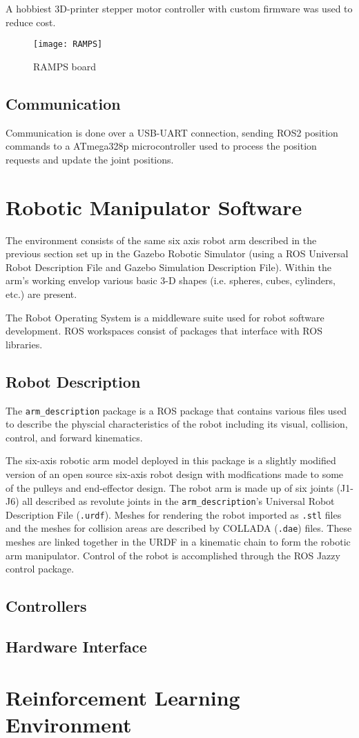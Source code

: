 A hobbiest 3D-printer stepper motor controller with custom firmware was used to reduce cost.
\begin{figure}[htb]
  \centering
  \texttt{[image: RAMPS]}
  \caption{RAMPS board}
  \label{fig:ramps}
\end{figure}

\subsection{Communication} \label{ss:communication}
Communication is done over a USB-UART connection, sending ROS2 position commands to a ATmega328p microcontroller used to process the position requests and update the joint positions.


\section{Robotic Manipulator Software} \label{se:virtual_overview}
The environment consists of the same six axis robot arm described in the previous section set up in the Gazebo Robotic Simulator (using a ROS Universal Robot Description File and Gazebo Simulation Description File).
Within the arm's working envelop various basic 3-D shapes (i.e. spheres, cubes, cylinders, etc.) are present.

The Robot Operating System is a middleware suite used for robot software development.
ROS workspaces consist of packages that interface with ROS libraries. 
\subsection{Robot Description} \label{ss:description_package}
The \texttt{arm\_description} package is a ROS package that contains various files used to describe the physcial characteristics of the robot including its visual, collision, control, and forward kinematics.

The six-axis robotic arm model deployed in this package is a slightly modified version of an open source six-axis robot design with modfications made to some of the pulleys and end-effector design. The robot arm is made up of six joints (J1-J6) all described as revolute joints in the \texttt{arm\_description}'s Universal Robot Description File (\texttt{.urdf}). Meshes for rendering the robot imported as \texttt{.stl} files and the meshes for collision areas are described by COLLADA (\texttt{.dae}) files. These meshes are linked together in the URDF in a kinematic chain to form the robotic arm manipulator.
Control of the robot is accomplished through the ROS Jazzy control package.
\subsection{Controllers}

\subsection{Hardware Interface}

\section{Reinforcement Learning Environment}
